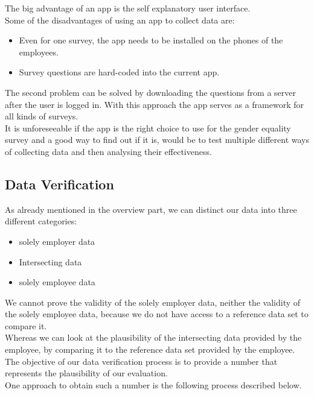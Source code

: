 \documentclass[portrait,a4paper]{article}
\begin{document}
			The big advantage of an app is the self explanatory user interface.\\

			Some of the disadvantages of using an app to collect data are:
			\begin{itemize}
				\item 	Even for one survey, the app needs to be installed on the phones of the employees.
				
				\item	Survey questions are hard-coded into the current app.
			\end{itemize}
			The second problem can be solved by downloading the questions from a server after the user is logged in. 
			With this approach the app serves as a framework for all kinds of surveys.\\

			It is unforeseeable if the app is the right choice to use for the gender equality survey and 
			a good way to find out if it is, would be to test multiple different ways of collecting data 
			and then analysing their effectiveness.
				
	\subsection{Data Verification}
		As already mentioned in the overview part, we can distinct our data into three different categories:
		\begin{itemize}
			\item	solely employer data
			\item	Intersecting data
			\item	solely employee data
		\end{itemize}
		We cannot prove the validity of the solely employer data, neither the validity of the solely employee data, because 
		we do not have access to a reference data set to compare it.\\
		Whereas we can look at the plausibility of the intersecting data provided by the employee, by comparing
		it to the reference data set provided by the employee.\\
		
		The objective of our data verification process is to provide a number that represents the plausibility
		of our evaluation.\\
		One approach to obtain such a number is the following process described below.\\
		
\end{document}
